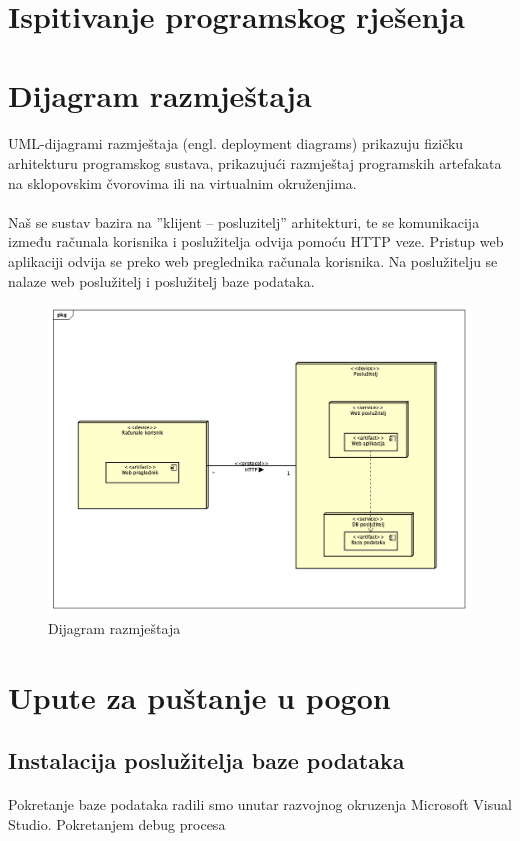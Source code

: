 \section{Ispitivanje programskog rješenja}

\section{Dijagram razmještaja}

\paragraph{}{
UML-dijagrami razmještaja (engl. deployment diagrams) prikazuju fizičku arhitekturu programskog sustava, prikazujući razmještaj programskih artefakata na sklopovskim čvorovima ili na virtualnim okruženjima.
}

\paragraph{}{
Naš se sustav bazira na ”klijent – posluzitelj” arhitekturi, te se komunikacija između računala korisnika i poslužitelja odvija pomoću HTTP veze. Pristup web aplikaciji odvija se preko web preglednika računala korisnika. Na poslužitelju se nalaze web poslužitelj i poslužitelj baze podataka.
}

\begin{figure}[!htb]
	\centering
	\includegraphics[width=1\linewidth]{dijagrami/DijagramRazmjestaja.png}
	\caption{Dijagram razmještaja}
	\label{fig:modelsdiagram}
\end{figure}

\section{Upute za puštanje u pogon}

\subsection{Instalacija poslužitelja baze podataka}

\paragraph{}{
	Pokretanje baze podataka radili smo unutar razvojnog okruzenja Microsoft Visual Studio. Pokretanjem debug procesa 
}




\eject